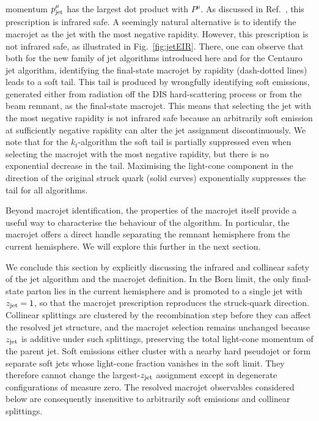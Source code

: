 momentum $p_{\rm jet}^{\mu}$ has the largest dot product with
$P^\mu$. As discussed in Ref.~\cite{vanBeekveld:2023chs}, this
prescription is infrared safe.
%
A seemingly natural alternative is to identify the macrojet as the jet
with the most negative rapidity.
%
However, this prescription is not infrared safe, as illustrated in Fig.~\ref{fig:jetEIR}. 
%
There, one can observe that both for the new family
of jet algorithms introduced here and for the Centauro jet algorithm, identifying the
final-state macrojet by rapidity (dash-dotted lines) leads to a soft tail. 
%
This tail is produced by wrongfully identifying soft emissions, generated either from radiation off the
DIS hard-scattering process or from the beam remnant, as the final-state macrojet. 
%
This means that selecting the jet with the most negative rapidity is not infrared safe because an arbitrarily soft emission at sufficiently negative rapidity can alter the jet assignment discontinuously. 
%
We note that for the $k_t$-algorithm the
soft tail is partially suppressed even when selecting the macrojet with the
most negative rapidity, but there is no exponential decrease in the tail.
%
Maximising the light-cone component in the direction of the 
original struck quark (solid curves) exponentially suppresses the tail for all
algorithms.

Beyond macrojet identification, the properties of the macrojet itself provide a useful way
to characterise the behaviour of the algorithm.
%
In particular, the macrojet offers a 
direct handle separating the remnant hemisphere from the current hemisphere.
%
We will explore this further in the next section.

We conclude this section by explicitly discussing the infrared and
collinear safety of the jet algorithm and the macrojet definition. In
the Born limit, the only final-state parton lies in the current
hemisphere and is promoted to a single jet with $z_{\rm jet}=1$, so
that the macrojet prescription reproduces the struck-quark
direction. Collinear splittings are clustered by the recombination
step before they can affect the resolved jet structure, and the
macrojet selection remains unchanged because $z_{\rm jet}$ is additive
under such splittings, preserving the total light-cone momentum of the
parent jet. Soft emissions either cluster with a nearby hard pseudojet
or form separate soft jets whose light-cone fraction vanishes in the
soft limit. They therefore cannot change the largest-$z_{\rm jet}$
assignment except in degenerate configurations of measure zero. The
resolved macrojet observables considered below are consequently
insensitive to arbitrarily soft emissions and collinear splittings.

